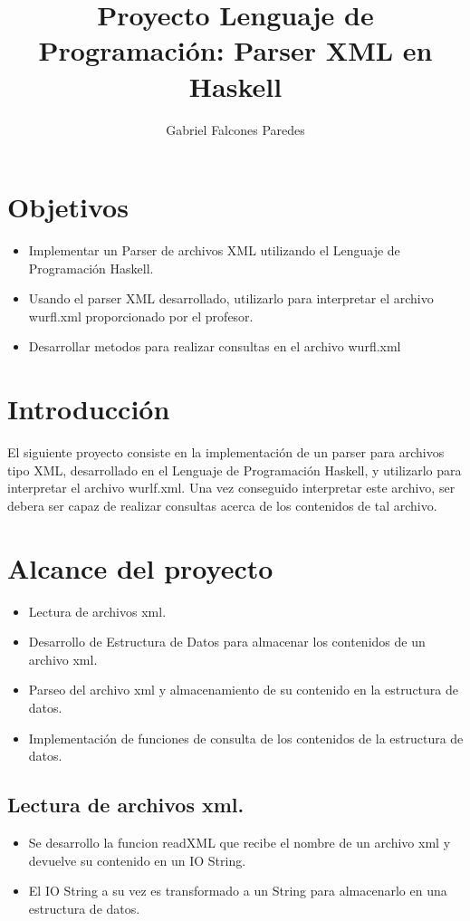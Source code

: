 \documentclass[11pt]{article} %
\title{Proyecto Lenguaje de Programación: Parser XML en Haskell}
\author{Gabriel Falcones Paredes}
\begin{document}
\maketitle

\section{Objetivos}

\begin{itemize}
	\item Implementar un Parser de archivos XML utilizando el Lenguaje de Programación Haskell.
	\item Usando el parser XML desarrollado, utilizarlo para interpretar el archivo wurfl.xml proporcionado por el profesor.
        \item Desarrollar metodos para realizar consultas en el archivo wurfl.xml
\end {itemize}

\section{Introducción}
El siguiente proyecto consiste en la implementación de un parser para archivos tipo XML, desarrollado en el Lenguaje de Programación Haskell, y utilizarlo para interpretar el archivo wurlf.xml. Una vez conseguido interpretar este archivo, ser debera ser capaz de realizar consultas acerca de los contenidos de tal archivo.


\section{Alcance del proyecto}
\begin{itemize}
	\item Lectura de archivos xml.
	\item Desarrollo de Estructura de Datos para almacenar los contenidos de un archivo xml.
	\item Parseo del archivo xml y almacenamiento de su contenido en la estructura de datos.
        \item Implementación de funciones de consulta de los contenidos de la estructura de datos.
\end{itemize}

\subsection{Lectura de archivos xml.}
\begin{itemize}
	\item Se desarrollo la funcion readXML que recibe el nombre de un archivo xml y devuelve su contenido en un IO String.
	\item El IO String a su vez es transformado a un String para almacenarlo en una estructura de datos.
\end{itemize}
\end{document}
